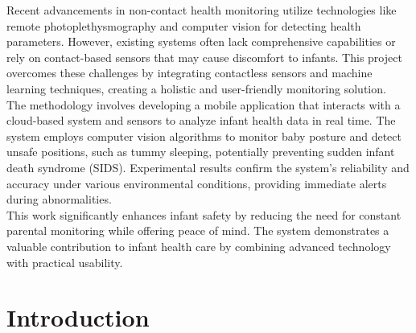 \documentclass[12pt,a4paper]{report}
\begin{document}
\noindent Recent advancements in non-contact health monitoring utilize technologies like remote photoplethysmography and computer vision for detecting health parameters. However, existing systems often lack comprehensive capabilities or rely on contact-based sensors that may cause discomfort to infants. This project overcomes these challenges by integrating contactless sensors and machine learning techniques, creating a holistic and user-friendly monitoring solution. \\

\noindent The methodology involves developing a mobile application that interacts with a cloud-based system and sensors to analyze infant health data in real time. The system employs computer vision algorithms to monitor baby posture and detect unsafe positions, such as tummy sleeping, potentially preventing sudden infant death syndrome (SIDS). Experimental results confirm the system's reliability and accuracy under various environmental conditions, providing immediate alerts during abnormalities. \\

\noindent This work significantly enhances infant safety by reducing the need for constant parental monitoring while offering peace of mind. 
The system demonstrates a valuable contribution to infant health care by combining advanced technology with practical usability.

\newpage
\renewcommand{\contentsname}{Table of Contents}
\tableofcontents
\listoffigures
{}
\listoftables
{}
\newpage

\pagestyle{fancy}
\fancyhf{}
\renewcommand{\headrulewidth}{0.5pt}
\renewcommand{\footrulewidth}{0.5pt}

\linespread{0.89}
\justifying
{}
\chapter{Introduction}
\par
\end{document}
